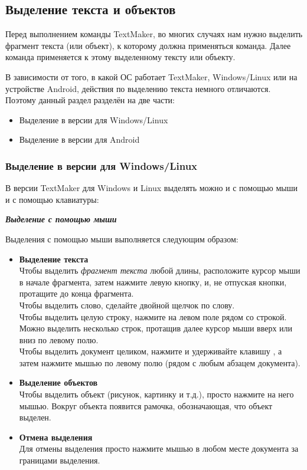\documentclass[a4paper,10pt]{article}
\begin{document}
\subsection{Выделение текста и объектов}
Перед выполнением команды TextMaker, во многих случаях нам нужно выделить фрагмент текста (или объект), к которому должна применяться команда. Далее команда применяется к этому выделенному тексту или объекту.

В зависимости от того, в какой ОС работает TextMaker, Windows/Linux или на устройстве Android, действия по выделению текста немного отличаются. Поэтому данный раздел разделён на две части:
\begin{itemize}
 \item Выделение в версии для Windows/Linux
 \item Выделение в версии для Android
\end{itemize}

\subsubsection{Выделение в версии для Windows/Linux}
В версии TextMaker для Windows и Linux выделять можно и с помощью мыши и с помощью клавиатуры:

\textbf{\textit{Выделение с помощью мыши}}

Выделения  с помощью мыши выполняется следующим образом:
\begin{itemize}
 \item \textbf{Выделение текста}\\
 Чтобы выделить \textit{фрагмент текста} любой длины, расположите курсор мыши в начале фрагмента, затем нажмите левую кнопку, и, не отпуская кнопки, протащите до конца фрагмента.\\
Чтобы выделить слово, сделайте двойной щелчок по слову.\\
Чтобы выделить целую строку, нажмите на левом поле рядом со строкой. Можно выделить несколько строк, протащив далее курсор мыши вверх или вниз по левому полю.\\
Чтобы выделить документ целиком, нажмите и удерживайте клавишу , а затем нажмите мышью по левому полю (рядом с любым абзацем документа).
\item \textbf{Выделение объектов}\\
Чтобы выделить объект (рисунок, картинку и т.д.), просто нажмите на него мышью. Вокруг объекта появится рамочка, обозначающая, что объект выделен.
\item \textbf{Отмена выделения}\\
Для отмены выделения просто нажмите мышью в любом месте документа за границами выделения.
\end{itemize}
\end{document}
